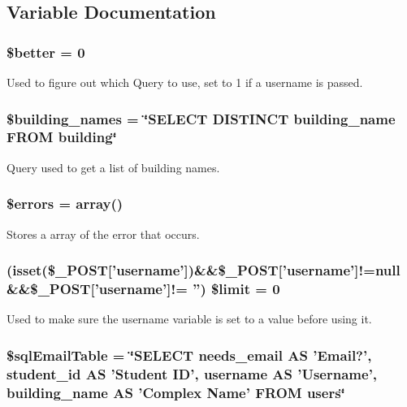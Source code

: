\subsection{\-Variable \-Documentation}
\hypertarget{email_8php_ae3232bcce9a4bbba3be65673e18de049}{
\subsubsection[{\$better}]{\setlength{\rightskip}{0pt plus 5cm}\$better = 0}}\label{email_8php_ae3232bcce9a4bbba3be65673e18de049}
\-Used to figure out which \-Query to use, set to 1 if a username is passed. \hypertarget{email_8php_a8ab55fcf525cc50064165d5b3e77e9a5}{
\subsubsection[{\$building\-\_\-names}]{\setlength{\rightskip}{0pt plus 5cm}\$building\-\_\-names = \char`\"{}\-S\-E\-L\-E\-C\-T \-D\-I\-S\-T\-I\-N\-C\-T building\-\_\-name \-F\-R\-O\-M building\char`\"{}}}\label{email_8php_a8ab55fcf525cc50064165d5b3e77e9a5}
\-Query used to get a list of building names. \hypertarget{email_8php_ab24faf4aa647cdcee494fc48524ad4ff}{
\subsubsection[{\$errors}]{\setlength{\rightskip}{0pt plus 5cm}\$errors = array()}}\label{email_8php_ab24faf4aa647cdcee494fc48524ad4ff}
\-Stores a array of the error that occurs. \hypertarget{email_8php_a0789d16925b198a139a7f9ea25fe4351}{
\subsubsection[{\$limit}]{ (isset(\$\-\_\-\-P\-O\-S\-T\mbox{[}'username'\mbox{]})\&\&\$\-\_\-\-P\-O\-S\-T\mbox{[}'username'\mbox{]}!=null \&\&\$\-\_\-\-P\-O\-S\-T\mbox{[}'username'\mbox{]}!= '') \$limit = 0}}\label{email_8php_a0789d16925b198a139a7f9ea25fe4351}
\-Used to make sure the username variable is set to a value before using it. \hypertarget{email_8php_a4eac19f61e471744dca8807b9f9c965c}{
\subsubsection[{\$sql\-Email\-Table}]{\setlength{\rightskip}{0pt plus 5cm}\$sql\-Email\-Table = \char`\"{}\-S\-E\-L\-E\-C\-T needs\-\_\-email \-A\-S '\-Email?', student\-\_\-id \-A\-S '\-Student \-I\-D', username \-A\-S '\-Username', building\-\_\-name \-A\-S '\-Complex \-Name' \-F\-R\-O\-M users\char`\"{}}}\label{email_8php_a4eac19f61e471744dca8807b9f9c965c}
